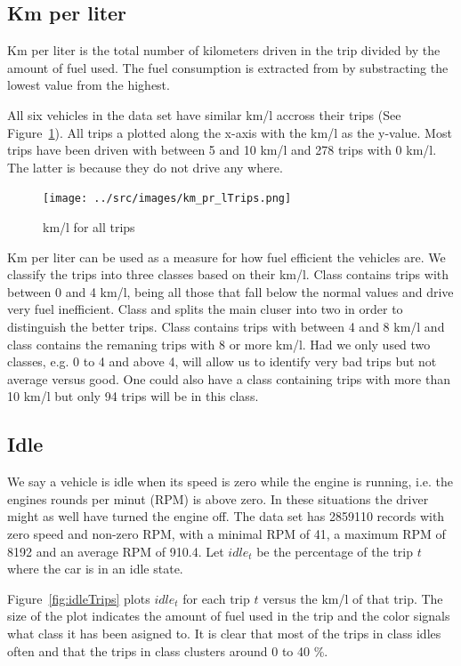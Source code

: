 
\subsection{Km per liter}
Km per liter is the total number of kilometers driven in the trip divided by the amount of fuel used.
The fuel consumption is extracted from  by substracting the lowest value from the highest.

All six vehicles in the data set have similar km/l accross their trips (See Figure~\ref{fig:kmlTrips}).
All trips a plotted along the x-axis with the km/l as the y-value.
Most trips have been driven with between 5 and 10 km/l and 278 trips with 0 km/l. %
The latter is because they do not drive any where.
\begin{figure}[htb]
\centering
\texttt{[image: ../src/images/km\_pr\_lTrips.png]}
\caption{km/l for all trips}
\label{fig:kmlTrips}
\end{figure}

Km per liter can be used as a measure for how fuel efficient the vehicles are.
We classify the trips into three classes based on their km/l.
Class \fuelLow contains trips with between 0 and 4 km/l, being all those that fall below the normal values and drive very fuel inefficient.
Class \fuelMedium and \fuelHigh splits the main cluser into two in order to distinguish the better trips.
Class \fuelMedium contains trips with between 4 and 8 km/l and class \fuelHigh contains the remaning trips with 8 or more km/l.
Had we only used two classes, e.g. 0 to 4 and above 4, will allow us to identify very bad trips but not average versus good. 
One could also have a class containing trips with more than 10 km/l but only 94 trips will be in this class. %

\subsection{Idle}
We say a vehicle is idle when its speed is zero while the engine is running, i.e. the engines rounds per minut (RPM) is above zero. 
In these situations the driver might as well have turned the engine off.
The data set has 2859110 records with zero speed and non-zero RPM, with a minimal RPM of 41, a maximum RPM of 8192 and an average RPM of 910.4. %
Let $idle_t$ be the percentage of the trip $t$ where the car is in an idle state.

Figure~\ref{fig:idleTrips} plots $idle_t$ for each trip $t$ versus the km/l of that trip.
The size of the plot indicates the amount of fuel used in the trip and the color signals what class it has been asigned to. 
It is clear that most of the trips in class \fuelLow idles often and that the trips in class \fuelHigh clusters around 0 to 40 \%.


